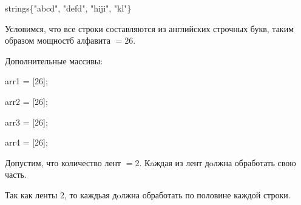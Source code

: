\documentclass[12pt]{report}
\begin{document}
\begin{center}
	strings\{"abcd", "defd", "hiji", "kl"\}
\end{center}

Условимся, что все строки составляются из английских строчных букв, таким образом мощностб алфавита $= 26$.

Дополнительные массивы:
\begin{center}
	arr1 = [26];
	
	arr2 = [26];
	
	arr3 = [26];
	
	arr4 = [26];
\end{center}

Допустим,   что  количество  лент $= 2$.  Кaждая из лент  дoлжна  обработать
свою часть.

Так  как  ленты  2,  то каждьая  дoлжна  обработать  по  половине  каждой 
строки.
\end{document}

